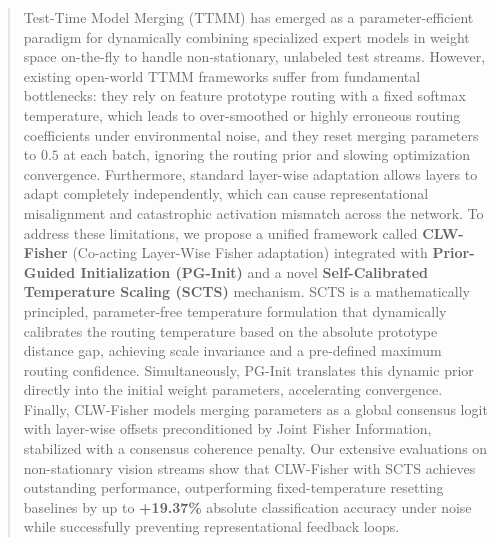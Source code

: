 \documentclass{article}
\theoremstyle{plain}
\theoremstyle{definition}
\theoremstyle{remark}
\begin{document}

\printAffiliationsAndNotice{}  %

\begin{abstract}
  Test-Time Model Merging (TTMM) has emerged as a parameter-efficient paradigm for dynamically combining specialized expert models in weight space on-the-fly to handle non-stationary, unlabeled test streams. However, existing open-world TTMM frameworks suffer from fundamental bottlenecks: they rely on feature prototype routing with a fixed softmax temperature, which leads to over-smoothed or highly erroneous routing coefficients under environmental noise, and they reset merging parameters to $0.5$ at each batch, ignoring the routing prior and slowing optimization convergence. Furthermore, standard layer-wise adaptation allows layers to adapt completely independently, which can cause representational misalignment and catastrophic activation mismatch across the network. To address these limitations, we propose a unified framework called \textbf{CLW-Fisher} (Co-acting Layer-Wise Fisher adaptation) integrated with \textbf{Prior-Guided Initialization (PG-Init)} and a novel \textbf{Self-Calibrated Temperature Scaling (SCTS)} mechanism. SCTS is a mathematically principled, parameter-free temperature formulation that dynamically calibrates the routing temperature based on the absolute prototype distance gap, achieving scale invariance and a pre-defined maximum routing confidence. Simultaneously, PG-Init translates this dynamic prior directly into the initial weight parameters, accelerating convergence. Finally, CLW-Fisher models merging parameters as a global consensus logit with layer-wise offsets preconditioned by Joint Fisher Information, stabilized with a consensus coherence penalty. Our extensive evaluations on non-stationary vision streams show that CLW-Fisher with SCTS achieves outstanding performance, outperforming fixed-temperature resetting baselines by up to \textbf{+19.37\%} absolute classification accuracy under noise while successfully preventing representational feedback loops.
\end{abstract}
\end{document}
